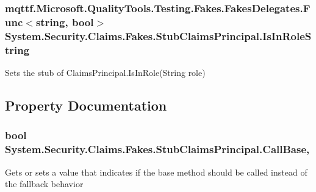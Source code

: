 \hypertarget{class_system_1_1_security_1_1_claims_1_1_fakes_1_1_stub_claims_principal_a82c306cc3d7e5ca25f76789cb90a0c75}{
\subsubsection[{Is\-In\-Role\-String}]{\setlength{\rightskip}{0pt plus 5cm}mqttf.\-Microsoft.\-Quality\-Tools.\-Testing.\-Fakes.\-Fakes\-Delegates.\-Func$<$string, bool$>$ System.\-Security.\-Claims.\-Fakes.\-Stub\-Claims\-Principal.\-Is\-In\-Role\-String}}\label{class_system_1_1_security_1_1_claims_1_1_fakes_1_1_stub_claims_principal_a82c306cc3d7e5ca25f76789cb90a0c75}


Sets the stub of Claims\-Principal.\-Is\-In\-Role(\-String role)



\subsection{Property Documentation}
\hypertarget{class_system_1_1_security_1_1_claims_1_1_fakes_1_1_stub_claims_principal_ab1f570aa8a013d230a70a2263343c6c5}{
\subsubsection[{Call\-Base}]{\setlength{\rightskip}{0pt plus 5cm}bool System.\-Security.\-Claims.\-Fakes.\-Stub\-Claims\-Principal.\-Call\-Base\hspace{0.3cm}{\ttfamily [get]}, {\ttfamily [set]}}}\label{class_system_1_1_security_1_1_claims_1_1_fakes_1_1_stub_claims_principal_ab1f570aa8a013d230a70a2263343c6c5}


Gets or sets a value that indicates if the base method should be called instead of the fallback behavior

